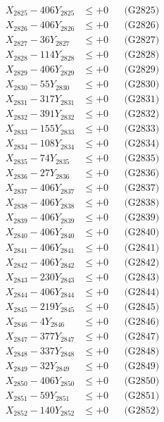 \documentclass[a4paper,10pt]{article}
\begin{document}
{\begin{align}
X_{2825} - 406Y_{2825} &\leq +0 && \text{(G2825)} \\
X_{2826} - 406Y_{2826} &\leq +0 && \text{(G2826)} \\
X_{2827} - 36Y_{2827} &\leq +0 && \text{(G2827)} \\
X_{2828} - 114Y_{2828} &\leq +0 && \text{(G2828)} \\
X_{2829} - 406Y_{2829} &\leq +0 && \text{(G2829)} \\
X_{2830} - 55Y_{2830} &\leq +0 && \text{(G2830)} \\
\allowbreak
X_{2831} - 317Y_{2831} &\leq +0 && \text{(G2831)} \\
X_{2832} - 391Y_{2832} &\leq +0 && \text{(G2832)} \\
X_{2833} - 155Y_{2833} &\leq +0 && \text{(G2833)} \\
X_{2834} - 108Y_{2834} &\leq +0 && \text{(G2834)} \\
X_{2835} - 74Y_{2835} &\leq +0 && \text{(G2835)} \\
X_{2836} - 27Y_{2836} &\leq +0 && \text{(G2836)} \\
X_{2837} - 406Y_{2837} &\leq +0 && \text{(G2837)} \\
X_{2838} - 406Y_{2838} &\leq +0 && \text{(G2838)} \\
X_{2839} - 406Y_{2839} &\leq +0 && \text{(G2839)} \\
X_{2840} - 406Y_{2840} &\leq +0 && \text{(G2840)} \\
\allowbreak
X_{2841} - 406Y_{2841} &\leq +0 && \text{(G2841)} \\
X_{2842} - 406Y_{2842} &\leq +0 && \text{(G2842)} \\
X_{2843} - 230Y_{2843} &\leq +0 && \text{(G2843)} \\
X_{2844} - 406Y_{2844} &\leq +0 && \text{(G2844)} \\
X_{2845} - 219Y_{2845} &\leq +0 && \text{(G2845)} \\
X_{2846} - 4Y_{2846} &\leq +0 && \text{(G2846)} \\
X_{2847} - 377Y_{2847} &\leq +0 && \text{(G2847)} \\
X_{2848} - 337Y_{2848} &\leq +0 && \text{(G2848)} \\
X_{2849} - 32Y_{2849} &\leq +0 && \text{(G2849)} \\
X_{2850} - 406Y_{2850} &\leq +0 && \text{(G2850)} \\
\allowbreak
X_{2851} - 59Y_{2851} &\leq +0 && \text{(G2851)} \\
X_{2852} - 140Y_{2852} &\leq +0 && \text{(G2852)} \\

\end{align}}
\end{document}
